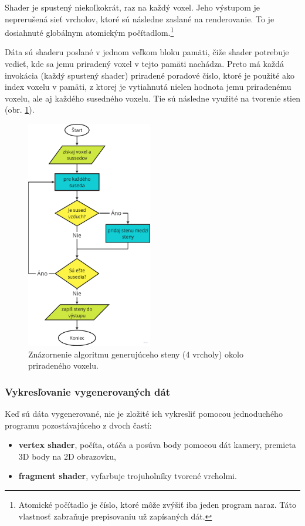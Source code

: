 \documentclass[12pt]{article}
\begin{document}
Shader je spustený niekoľkokrát, raz na každý voxel. Jeho výstupom je
neprerušená sieť vrcholov, ktoré sú následne zaslané na renderovanie.
To je dosiahnuté globálnym atomickým počítadlom.\footnote
{Atomické počítadlo je číslo, ktoré môže zvýšiť iba jeden program naraz. Táto
	vlastnosť zabraňuje prepisovaniu už zapísaných dát.}

Dáta sú shaderu poslané v jednom veľkom bloku pamäti, čiže shader potrebuje
vedieť, kde sa jemu priradený voxel v tejto pamäti nachádza. Preto má každá
invokácia (každý spustený shader) priradené poradové číslo, ktoré
je použité ako index voxelu v pamäti, z ktorej je vytiahnutá nielen
hodnota jemu priradenému voxelu, ale aj každého susedného voxelu. Tie sú
následne využité na tvorenie stien
(obr. \ref{obr:diagram algoritmu generujuceho vertexy}).

\begin{figure}[ht]
	\centering
	\includegraphics[height=10cm]{res/diagram_generovanie_voxelov.png}
	\caption{Znázornenie algoritmu generujúceho steny (4 vrcholy) okolo priradeného voxelu.}
	\label{obr:diagram algoritmu generujuceho vertexy}
\end{figure}

\newpage
\subsubsection{Vykresľovanie vygenerovaných dát}

Keď sú dáta vygenerované, nie je zložité ich vykresliť pomocou jednoduchého
programu pozostávajúceho z dvoch častí:

\begin{itemize}
	\item \textbf{vertex shader}, počíta, otáča a posúva body pomocou dát kamery,
	      premieta 3D body na 2D obrazovku,
	\item \textbf{fragment shader}, vyfarbuje trojuholníky tvorené vrcholmi.
\end{itemize}
\end{document}

